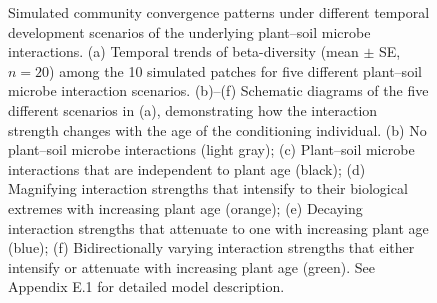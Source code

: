 \newpage
\begin{figure}[h]
	\centering
	\caption[Simulated community convergence patterns under different temporal development scenarios of the underlying plant--soil microbe interactions.]
		{\hspace{1mm} 
		Simulated community convergence patterns under different temporal development scenarios of the underlying plant--soil microbe interactions.
		(a) Temporal trends of beta-diversity (mean $\pm$ SE, $n = 20$) among the 10 simulated patches for five different plant--soil microbe interaction scenarios. (b)--(f) Schematic diagrams of the five different scenarios in (a), demonstrating how the interaction strength changes with the age of the conditioning individual.
		(b) No plant--soil microbe interactions (light gray); (c) Plant--soil microbe interactions that are independent to plant age (black); (d) Magnifying interaction strengths that intensify to their biological extremes with increasing plant age (orange); (e) Decaying interaction strengths that attenuate to one with increasing plant age (blue); (f) Bidirectionally varying interaction strengths that either intensify or attenuate with increasing plant age (green). See Appendix E.1 for detailed model description.}
	\label{fig:SimulationComplexPSF}
\end{figure}


